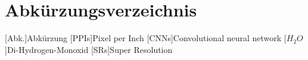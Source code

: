 
\chapter*{Abkürzungsverzeichnis}

\begin{acronym}[DHBW]
    [Abk.]{Abkürzung}
    [PPIs]{Pixel per Inch}
    [CNNs]{Convolutional neural network}
    [\ensuremath{H_2O}]{Di-Hydrogen-Monoxid}
    [SRs]{Super Resolution}
    
\end{acronym}